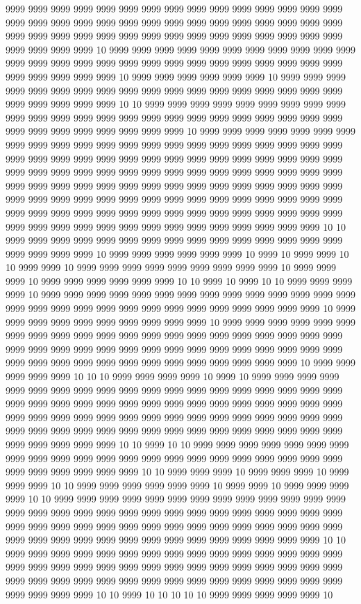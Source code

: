 9999 9999 9999 9999 9999 9999 9999 9999 9999 9999 9999 9999 9999 9999 9999 9999 9999 9999 9999 9999 9999 9999 9999 9999 9999 9999 9999 9999 9999 9999 9999 9999 9999 9999 9999 9999 9999 9999 9999 9999 9999 9999 9999 9999 9999 9999 9999 9999 9999 10 9999 9999 9999 9999 9999 9999 9999 9999 9999 9999 9999 9999 9999 9999 9999 9999 9999 9999 9999 9999 9999 9999 9999 9999 9999 9999 9999 9999 9999 9999 9999 10 9999 9999 9999 9999 9999 9999 10 9999 9999 9999 9999 9999 9999 9999 9999 9999 9999 9999 9999 9999 9999 9999 9999 9999 9999 9999 9999 9999 9999 9999 10 10 9999 9999 9999 9999 9999 9999 9999 9999 9999 9999 9999 9999 9999 9999 9999 9999 9999 9999 9999 9999 9999 9999 9999 9999 9999 9999 9999 9999 9999 9999 9999 9999 10 9999 9999 9999 9999 9999 9999 9999 9999 9999 9999 9999 9999 9999 9999 9999 9999 9999 9999 9999 9999 9999 9999 9999 9999 9999 9999 9999 9999 9999 9999 9999 9999 9999 9999 9999 9999 9999 9999 9999 9999 9999 9999 9999 9999 9999 9999 9999 9999 9999 9999 9999 9999 9999 9999 9999 9999 9999 9999 9999 9999 9999 9999 9999 9999 9999 9999 9999 9999 9999 9999 9999 9999 9999 9999 9999 9999 9999 9999 9999 9999 9999 9999 9999 9999 9999 9999 9999 9999 9999 9999 9999 9999 9999 9999 9999 9999 9999 9999 9999 9999 9999 9999 9999 9999 9999 9999 9999 9999 9999 9999 9999 10 10 9999 9999 9999 9999 9999 9999 9999 9999 9999 9999 9999 9999 9999 9999 9999 9999 9999 9999 9999 10 9999 9999 9999 9999 9999 9999 10 9999 10 9999 9999 10 10 9999 9999 10 9999 9999 9999 9999 9999 9999 9999 9999 9999 10 9999 9999 9999 10 9999 9999 9999 9999 9999 9999 10 10 9999 10 9999 10 10 9999 9999 9999 9999 10 9999 9999 9999 9999 9999 9999 9999 9999 9999 9999 9999 9999 9999 9999 9999 9999 9999 9999 9999 9999 9999 9999 9999 9999 9999 9999 9999 9999 10 9999 9999 9999 9999 9999 9999 9999 9999 9999 9999 10 9999 9999 9999 9999 9999 9999 9999 9999 9999 9999 9999 9999 9999 9999 9999 9999 9999 9999 9999 9999 9999 9999 9999 9999 9999 9999 9999 9999 9999 9999 9999 9999 9999 9999 9999 9999 9999 9999 9999 9999 9999 9999 9999 9999 9999 9999 9999 9999 9999 10 9999 9999 9999 9999 9999 10 10 10 9999 9999 9999 9999 10 9999 10 9999 9999 9999 9999 9999 9999 9999 9999 9999 9999 9999 9999 9999 9999 9999 9999 9999 9999 9999 9999 9999 9999 9999 9999 9999 9999 9999 9999 9999 9999 9999 9999 9999 9999 9999 9999 9999 9999 9999 9999 9999 9999 9999 9999 9999 9999 9999 9999 9999 9999 9999 9999 9999 9999 9999 9999 9999 9999 9999 9999 9999 9999 9999 9999 9999 9999 9999 9999 9999 10 10 9999 10 10 9999 9999 9999 9999 9999 9999 9999 9999 9999 9999 9999 9999 9999 9999 9999 9999 9999 9999 9999 9999 9999 9999 9999 9999 9999 9999 9999 9999 10 10 9999 9999 9999 10 9999 9999 9999 10 9999 9999 9999 10 10 9999 9999 9999 9999 9999 9999 10 9999 9999 10 9999 9999 9999 9999 10 10 9999 9999 9999 9999 9999 9999 9999 9999 9999 9999 9999 9999 9999 9999 9999 9999 9999 9999 9999 9999 9999 9999 9999 9999 9999 9999 9999 9999 9999 9999 9999 9999 9999 9999 9999 9999 9999 9999 9999 9999 9999 9999 9999 9999 9999 9999 9999 9999 9999 9999 9999 9999 9999 9999 9999 9999 9999 10 10 9999 9999 9999 9999 9999 9999 9999 9999 9999 9999 9999 9999 9999 9999 9999 9999 9999 9999 9999 9999 9999 9999 9999 9999 9999 9999 9999 9999 9999 9999 9999 9999 9999 9999 9999 9999 9999 9999 9999 9999 9999 9999 9999 9999 9999 9999 9999 9999 9999 10 10 9999 10 10 10 10 10 9999 9999 9999 9999 9999 10 